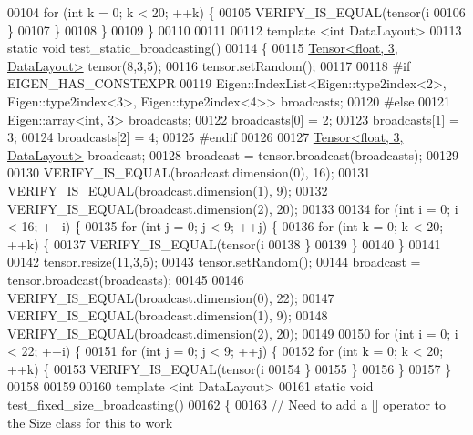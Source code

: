 \begin{DoxyCode}
00104       \textcolor{keywordflow}{for} (\textcolor{keywordtype}{int} k = 0; k < 20; ++k) \{
00105         VERIFY\_IS\_EQUAL(tensor(i%
00106       \}
00107     \}
00108   \}
00109 \}
00110 
00111 
00112 \textcolor{keyword}{template} <\textcolor{keywordtype}{int} DataLayout>
00113 \textcolor{keyword}{static} \textcolor{keywordtype}{void} test\_static\_broadcasting()
00114 \{
00115   \hyperlink{class_eigen_1_1_tensor}{Tensor<float, 3, DataLayout>} tensor(8,3,5);
00116   tensor.setRandom();
00117 
00118 \textcolor{preprocessor}{#if EIGEN\_HAS\_CONSTEXPR}
00119   Eigen::IndexList<Eigen::type2index<2>, Eigen::type2index<3>, Eigen::type2index<4>> broadcasts;
00120 \textcolor{preprocessor}{#else}
00121   \hyperlink{class_eigen_1_1array}{Eigen::array<int, 3>} broadcasts;
00122   broadcasts[0] = 2;
00123   broadcasts[1] = 3;
00124   broadcasts[2] = 4;
00125 \textcolor{preprocessor}{#endif}
00126 
00127   \hyperlink{class_eigen_1_1_tensor}{Tensor<float, 3, DataLayout>} broadcast;
00128   broadcast = tensor.broadcast(broadcasts);
00129 
00130   VERIFY\_IS\_EQUAL(broadcast.dimension(0), 16);
00131   VERIFY\_IS\_EQUAL(broadcast.dimension(1), 9);
00132   VERIFY\_IS\_EQUAL(broadcast.dimension(2), 20);
00133 
00134   \textcolor{keywordflow}{for} (\textcolor{keywordtype}{int} i = 0; i < 16; ++i) \{
00135     \textcolor{keywordflow}{for} (\textcolor{keywordtype}{int} j = 0; j < 9; ++j) \{
00136       \textcolor{keywordflow}{for} (\textcolor{keywordtype}{int} k = 0; k < 20; ++k) \{
00137         VERIFY\_IS\_EQUAL(tensor(i%
00138       \}
00139     \}
00140   \}
00141 
00142   tensor.resize(11,3,5);
00143   tensor.setRandom();
00144   broadcast = tensor.broadcast(broadcasts);
00145 
00146   VERIFY\_IS\_EQUAL(broadcast.dimension(0), 22);
00147   VERIFY\_IS\_EQUAL(broadcast.dimension(1), 9);
00148   VERIFY\_IS\_EQUAL(broadcast.dimension(2), 20);
00149 
00150   \textcolor{keywordflow}{for} (\textcolor{keywordtype}{int} i = 0; i < 22; ++i) \{
00151     \textcolor{keywordflow}{for} (\textcolor{keywordtype}{int} j = 0; j < 9; ++j) \{
00152       \textcolor{keywordflow}{for} (\textcolor{keywordtype}{int} k = 0; k < 20; ++k) \{
00153         VERIFY\_IS\_EQUAL(tensor(i%
00154       \}
00155     \}
00156   \}
00157 \}
00158 
00159 
00160 \textcolor{keyword}{template} <\textcolor{keywordtype}{int} DataLayout>
00161 \textcolor{keyword}{static} \textcolor{keywordtype}{void} test\_fixed\_size\_broadcasting()
00162 \{
00163   \textcolor{comment}{// Need to add a [] operator to the Size class for this to work}

\end{DoxyCode}
